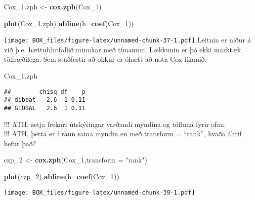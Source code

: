 \documentclass[
]{book}
\newenvironment{Shaded}{\begin{snugshade}}{\end{snugshade}}
\newcommand{\DataTypeTok}[1]{\textcolor[rgb]{0.13,0.29,0.53}{#1}}
\newcommand{\DecValTok}[1]{\textcolor[rgb]{0.00,0.00,0.81}{#1}}
\newcommand{\FloatTok}[1]{\textcolor[rgb]{0.00,0.00,0.81}{#1}}
\newcommand{\KeywordTok}[1]{\textcolor[rgb]{0.13,0.29,0.53}{\textbf{#1}}}
\newcommand{\NormalTok}[1]{#1}
\newcommand{\StringTok}[1]{\textcolor[rgb]{0.31,0.60,0.02}{#1}}
\begin{document}
\begin{Shaded}
\begin{Highlighting}[]
\NormalTok{Cox\_}\FloatTok{1.}\NormalTok{zph <{-}}\StringTok{ }\KeywordTok{cox.zph}\NormalTok{(Cox\_}\DecValTok{1}\NormalTok{)}
\end{Highlighting}
\end{Shaded}

\begin{Shaded}
\begin{Highlighting}[]
\KeywordTok{plot}\NormalTok{(Cox\_}\FloatTok{1.}\NormalTok{zph)}
\KeywordTok{abline}\NormalTok{(}\DataTypeTok{h=}\KeywordTok{coef}\NormalTok{(Cox\_}\DecValTok{1}\NormalTok{))}
\end{Highlighting}
\end{Shaded}

\texttt{[image: BOK\_files/figure-latex/unnamed-chunk-37-1.pdf]}
Leitnin er niður á við þ.e. hættuhlutfallið minnkar með tímanum. Lækkunin er þó ekki marktæk tölfræðilega. Sem staðfestir að okkur er óhætt að nota Cox-líkanið.

\begin{Shaded}
\begin{Highlighting}[]
\NormalTok{Cox\_}\FloatTok{1.}\NormalTok{zph}
\end{Highlighting}
\end{Shaded}

\begin{verbatim}
##        chisq df    p
## dibpat   2.6  1 0.11
## GLOBAL   2.6  1 0.11
\end{verbatim}

!!! ATH, setja frekari útskýringar varðandi myndina og töfluna fyrir ofan.\\
!!! ATH, þetta er í raun sama myndin en með transform = ``rank'', hvaða áhrif hefur það?

\begin{Shaded}
\begin{Highlighting}[]
\NormalTok{czp\_}\DecValTok{2}\NormalTok{ <{-}}\StringTok{ }\KeywordTok{cox.zph}\NormalTok{(Cox\_}\DecValTok{1}\NormalTok{,}\DataTypeTok{transform =} \StringTok{"rank"}\NormalTok{)}

\KeywordTok{plot}\NormalTok{(czp\_}\DecValTok{2}\NormalTok{)}
\KeywordTok{abline}\NormalTok{(}\DataTypeTok{h=}\KeywordTok{coef}\NormalTok{(Cox\_}\DecValTok{1}\NormalTok{))}
\end{Highlighting}
\end{Shaded}

\texttt{[image: BOK\_files/figure-latex/unnamed-chunk-39-1.pdf]}
\end{document}
